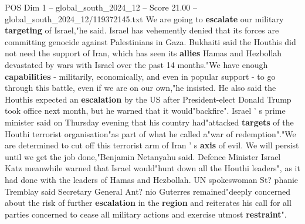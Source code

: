\begin{textsample}{POS Dim 1 – global\_south\_2024\_12 – Score 21.00 – global\_south\_2024\_12/119372145.txt}
We are going to \textbf{escalate} our military \textbf{targeting} of Israel,"he said.
Israel has vehemently denied that its forces are committing genocide against Palestinians in Gaza.
Bukhaiti said the Houthis did not need the support of Iran, which has seen its \textbf{allies} Hamas and Hezbollah devastated by wars with Israel over the past 14 months."We have enough \textbf{capabilities} - militarily, economically, and even in popular support - to go through this battle, even if we are on our own,"he insisted.
He also said the Houthis expected an \textbf{escalation} by the US after President-elect Donald Trump took office next month, but he warned that it would"backfire".
Israel ' s prime minister said on Thursday evening that his country had"attacked \textbf{targets} of the Houthi terrorist organisation"as part of what he called a"war of redemption"."We are determined to cut off this terrorist arm of Iran ' s \textbf{axis} of evil.
We will persist until we get the job done,"Benjamin Netanyahu said.
Defence Minister Israel Katz meanwhile warned that Israel would"hunt down all the Houthi leaders", as it had done with the leaders of Hamas and Hezbollah.
UN spokeswoman St? phanie Tremblay said Secretary General Ant? nio Guterres remained"deeply concerned about the risk of further \textbf{escalation} in the \textbf{region} and reiterates his call for all parties concerned to cease all military actions and exercise utmost \textbf{restraint}".

\end{textsample}
